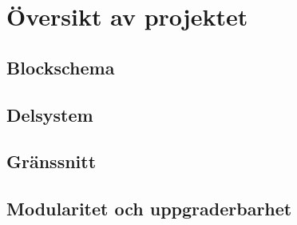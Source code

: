 \documentclass[systemskiss/skiss.tex]{subfiles}
\begin{document}
\section{Översikt av projektet}
\subsection{Blockschema}
\subsection{Delsystem}

\subsection{Gränssnitt}
\subsection{Modularitet och uppgraderbarhet}
\end{document}
